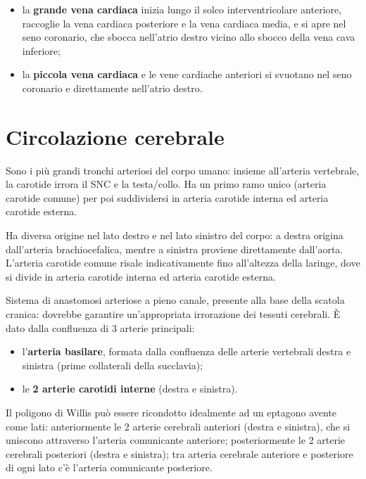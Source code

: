 \begin{itemize}
  \item la \textbf{grande vena cardiaca} inizia lungo il solco interventricolare anteriore,
    raccoglie la vena cardiaca posteriore e la vena cardiaca media, e si apre nel seno coronario,
    che sbocca nell'atrio destro vicino allo sbocco della vena cava inferiore;
  \item la \textbf{piccola vena cardiaca} e le vene cardiache anteriori si svuotano nel seno
    coronario e direttamente nell'atrio destro.
\end{itemize}

\section{Circolazione cerebrale}

Sono i più grandi tronchi arteriosi del corpo umano: insieme all'arteria vertebrale, la carotide
irrora il SNC e la testa/collo. Ha un primo ramo unico (arteria carotide comune) per poi
suddividersi in arteria carotide interna ed arteria carotide esterna.

Ha diversa origine nel lato destro e nel lato sinistro del corpo: a destra origina dall'arteria
brachiocefalica, mentre a sinistra proviene direttamente dall'aorta. L'arteria carotide comune
risale indicativamente fino all'altezza della laringe, dove si divide in arteria carotide interna
ed arteria carotide esterna.

Sistema di anastomosi arteriose a pieno canale, presente alla base della scatola cranica: dovrebbe
garantire un'appropriata irrorazione dei tessuti cerebrali. È dato dalla confluenza di 3 arterie
principali:
\begin{itemize}
  \item l'\textbf{arteria basilare}, formata dalla confluenza delle arterie vertebrali destra e
    sinistra (prime collaterali della succlavia);
  \item le \textbf{2 arterie carotidi interne} (destra e sinistra).
\end{itemize}

Il poligono di Willis può essere ricondotto idealmente ad un eptagono avente come lati:
anteriormente le 2 arterie cerebrali anteriori (destra e sinistra), che si uniscono attraverso
l'arteria comunicante anteriore; posteriormente le 2 arterie cerebrali posteriori (destra e
sinistra); tra arteria cerebrale anteriore e posteriore di ogni lato c'è l'arteria comunicante
posteriore.


